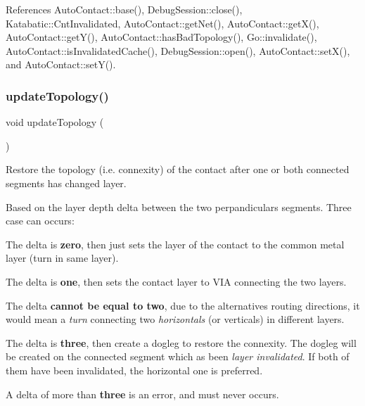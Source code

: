References Auto\+Contact\+::base(), Debug\+Session\+::close(), Katabatic\+::\+Cnt\+Invalidated, Auto\+Contact\+::get\+Net(), Auto\+Contact\+::get\+X(), Auto\+Contact\+::get\+Y(), Auto\+Contact\+::has\+Bad\+Topology(), Go\+::invalidate(), Auto\+Contact\+::is\+Invalidated\+Cache(), Debug\+Session\+::open(), Auto\+Contact\+::set\+X(), and Auto\+Contact\+::set\+Y().

\mbox{\label{classKatabatic_1_1AutoContactTurn_af5bf1f5e71204ef84346e4e036175431}} 
\subsubsection{\texorpdfstring{update\+Topology()}{updateTopology()}}
{\footnotesize\ttfamily void update\+Topology (\begin{DoxyParamCaption}{ }\end{DoxyParamCaption})\hspace{0.3cm}{\ttfamily [virtual]}}

Restore the topology (i.\+e. connexity) of the contact after one or both connected segments has changed layer.

Based on the layer depth delta between the two perpandiculars segments. Three case can occurs\+:
\begin{DoxyItemize}
\item The delta is {\bfseries zero}, then just sets the layer of the contact to the common metal layer (turn in same layer).
\item The delta is {\bfseries one}, then sets the contact layer to V\+IA connecting the two layers.
\item The delta {\bfseries cannot be equal to two}, due to the alternatives routing directions, it would mean a {\itshape turn} connecting two {\itshape horizontals} (or verticals) in different layers.
\item The delta is {\bfseries three}, then create a dogleg to restore the connexity. The dogleg will be created on the connected segment which as been {\itshape layer invalidated}. If both of them have been invalidated, the horizontal one is preferred.
\item A delta of more than {\bfseries three} is an error, and must never occurs.
\end{DoxyItemize}

